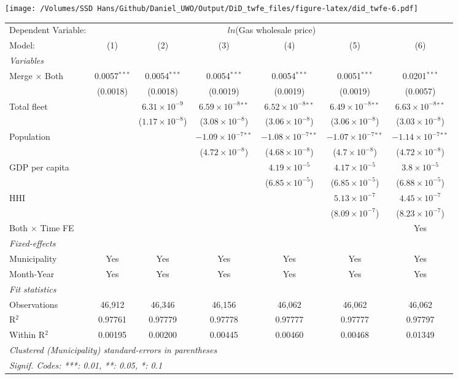 \documentclass[
]{article}
\begin{document}
\texttt{[image: /Volumes/SSD Hans/Github/Daniel\_UWO/Output/DiD\_twfe\_files/figure-latex/did\_twfe-6.pdf]}

\begin{tabular}{lcccccc}
\tabularnewline\midrule\midrule
Dependent Variable:&\multicolumn{6}{c}{$ln$(Gas wholesale price)}\\
Model:&(1) & (2) & (3) & (4) & (5) & (6)\\
\midrule \emph{Variables}&   &   &   &   &   &  \\
Merge $\times $ Both & 0.0057$^{***}$ & 0.0054$^{***}$ & 0.0054$^{***}$ & 0.0054$^{***}$ & 0.0051$^{***}$ & 0.0201$^{***}$\\
  &(0.0018) & (0.0018) & (0.0019) & (0.0019) & (0.0019) & (0.0057)\\
Total fleet &    & $6.31\times 10^{-9}$ & $6.59\times 10^{-8}$$^{**}$ & $6.52\times 10^{-8}$$^{**}$ & $6.49\times 10^{-8}$$^{**}$ & $6.63\times 10^{-8}$$^{**}$\\
  &   & ($1.17\times 10^{-8}$) & ($3.08\times 10^{-8}$) & ($3.06\times 10^{-8}$) & ($3.06\times 10^{-8}$) & ($3.03\times 10^{-8}$)\\
Population &    &    & $-1.09\times 10^{-7}$$^{**}$ & $-1.08\times 10^{-7}$$^{**}$ & $-1.07\times 10^{-7}$$^{**}$ & $-1.14\times 10^{-7}$$^{**}$\\
  &   &    & ($4.72\times 10^{-8}$) & ($4.68\times 10^{-8}$) & ($4.7\times 10^{-8}$) & ($4.72\times 10^{-8}$)\\
GDP per capita &    &    &    & $4.19\times 10^{-5}$ & $4.17\times 10^{-5}$ & $3.8\times 10^{-5}$\\
  &   &    &    & ($6.85\times 10^{-5}$) & ($6.85\times 10^{-5}$) & ($6.88\times 10^{-5}$)\\
HHI &    &    &    &    & $5.13\times 10^{-7}$ & $4.45\times 10^{-7}$\\
  &   &    &    &    & ($8.09\times 10^{-7}$) & ($8.23\times 10^{-7}$)\\
Both $\times$ Time FE &  &  &  &  &  & Yes\\
\midrule \emph{Fixed-effects}&   &   &   &   &   &  \\
Municipality & Yes & Yes & Yes & Yes & Yes & Yes\\
Month-Year & Yes & Yes & Yes & Yes & Yes & Yes\\
\midrule \emph{Fit statistics}&  & & & & & \\
Observations & 46,912&46,346&46,156&46,062&46,062&46,062\\
R$^2$ & 0.97761&0.97779&0.97778&0.97777&0.97777&0.97797\\
Within R$^2$ & 0.00195&0.00200&0.00445&0.00460&0.00468&0.01349\\
\midrule\midrule\multicolumn{7}{l}{\emph{Clustered (Municipality) standard-errors in parentheses}}\\
\multicolumn{7}{l}{\emph{Signif. Codes: ***: 0.01, **: 0.05, *: 0.1}}\\
\end{tabular}
\end{document}
